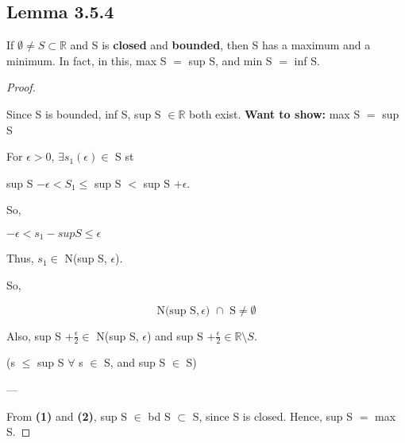 \documentclass{article}
\newcommand{\mt}[1]{\ensuremath{#1}}
\newcommand\ssc[2][\DefaultOpt]{%
  \def\DefaultOpt{#2}%
  \subsection[#1]{#2}%
}
\newcommand{\bgpf}{\begin{proof} $ $\newline}
\newcommand{\wts}[1]{\textbf{Want to show: } #1}
\newcommand{\bpth}[1]{\textbf{(#1)}}
\newcommand{\step}[2]{\begin{equation}\tag{#2}#1\end{equation}}
\newcommand{\epf}{\end{proof}}
\newcommand{\br}{\mt{\mathbb{R}} }       %
\newcommand{\ep}{\mt{\epsilon} }         %
\newcommand{\fa}{\mt{\forall} }          %
\newcommand{\es}{\mt{\emptyset}}        %
\newcommand{\sbs}{\mt{\subset} }         %
\newcommand{\bnm}[2]{\mt{#1\setminus{#2}}}
\newcommand{\nbho}[3]{\textrm{N(}#1, #2\textrm{) }\cap \textrm{ #3} \neq \emptyset}
\begin{document}
\ssc{Lemma 3.5.4}{
If $\es \neq S \sbs \br$ and S is \textbf{closed} and \textbf{bounded}, then S has a maximum and a minimum. In fact, in this, max S $=$ sup S, and min S $=$ inf S.

\bgpf

Since S is bounded, inf S, sup S $\in \br$ both exist.
\wts{max S $=$ sup S}

For $\epsilon > 0$, $\exists s_1 (\ep) \in$ S st \

sup S $- \ep < S_1 \leq$ sup S $<$ sup S $+ \ep$.

So,

$-\ep < s_1 - sup S \leq \ep$

Thus, $s_1 \in$ N(sup S, $\ep$). \

So, 

\step{\nbho{\textrm{sup S}}{\ep}{S}}{1}

Also, sup S $+ \frac{\epsilon}{2} \in$ N(sup S, $\ep$) and sup S $+ \frac{\epsilon}{2} \in \bnm{\br}{S}$.

(s $\leq$ sup S $\fa$ s $\in$ S, and sup S $\in$ S)

---


From \bpth{1} and \bpth{2}, sup S $\in$ bd S $\sbs$ S, since S is closed. Hence, sup S $=$ max S.

\epf
}
\end{document}
